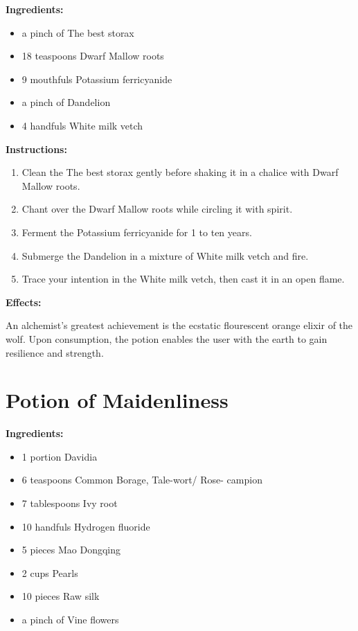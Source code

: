 \documentclass{article}
\begin{document}
\textbf{Ingredients:}

\begin{itemize}
  \item a pinch of The best storax
  \item 18 teaspoons Dwarf Mallow roots
  \item 9 mouthfuls Potassium ferricyanide
  \item a pinch of Dandelion
  \item 4 handfuls White milk vetch
\end{itemize}

\textbf{Instructions:}

\begin{enumerate}
  \item Clean the The best storax gently before shaking it in a chalice with Dwarf Mallow roots.
  \item Chant over the Dwarf Mallow roots while circling it with spirit.
  \item Ferment the Potassium ferricyanide for 1 to ten years.
  \item Submerge the Dandelion in a mixture of White milk vetch and fire.
  \item Trace your intention in the White milk vetch, then cast it in an open flame.
\end{enumerate}

\textbf{Effects:}

An alchemist's greatest achievement is the ecstatic flourescent orange elixir of the wolf. Upon consumption, the potion enables the user with the earth to gain resilience and strength.

\newpage
\section*{Potion of Maidenliness}

\textbf{Ingredients:}

\begin{itemize}
  \item 1 portion Davidia
  \item 6 teaspoons Common Borage, Tale-wort/ Rose- campion
  \item 7 tablespoons Ivy root
  \item 10 handfuls Hydrogen fluoride
  \item 5 pieces Mao Dongqing
  \item 2 cups Pearls
  \item 10 pieces Raw silk
  \item a pinch of Vine flowers
\end{itemize}
\end{document}
